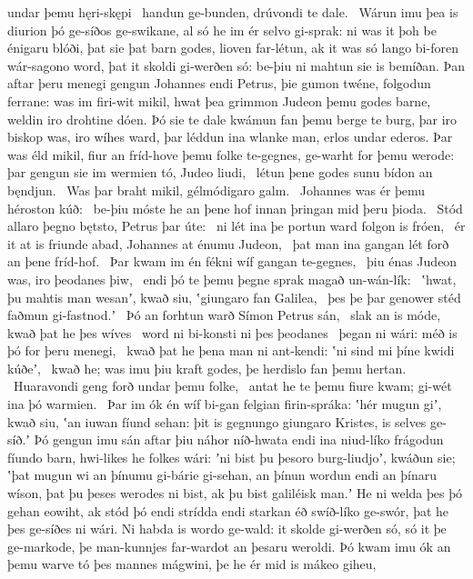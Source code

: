 undar þemu hęri-skępi \hld\ handun ge-bunden,
drúvondi te dale. \hld\ Wárun imu þea is diurion þó
ge-síðos ge-swikane, al só he im ér selvo gi-sprak:
ni was it þoh be énigaru blóði, þat sie þat barn godes,
lioven far-létun, ak it was só lango bi-foren
wár-sagono word, þat it skoldi gi-werðen só:
be-þiu ni mahtun sie is bemíðan. Þan aftar þeru menegi gengun
Johannes endi Petrus, þie gumon twéne,
folgodun ferrane: was im firi-wit mikil,
hwat þea grimmon Judeon þemu godes barne,
weldin iro drohtine dóen. Þó sie te dale kwámun
fan þemu berge te burg, þar iro biskop was,
iro wíhes ward, þar léddun ina wlanke man,
erlos undar ederos. Þar was éld mikil,
fiur an fríd-hove þemu folke te-gegnes,
ge-warht for þemu werode: þar gengun sie im wermien tó,
Judeo liudi, \hld\ létun þene godes sunu
bídon an bęndjun. \hld\ Was þar braht mikil,
gélmódigaro galm. \hld\ Johannes was ér
þemu héroston kúð: \hld\ be-þiu móste he an þene hof innan
þringan mid þeru þioda. \hld\ Stód allaro þegno bętsto,
Petrus þar úte: \hld\ ni lét ina þe portun ward
folgon is fróen, \hld\ ér it at is friunde abad,
Johannes at énumu Judeon, \hld\ þat man ina gangan lét
forð an þene fríd-hof. \hld\ Þar kwam im én fékni wíf
gangan te-gegnes, \hld\ þiu énas Judeon was,
iro þeodanes þiw, \hld\ endi þó te þemu þegne sprak
magað un-wán-lík: \hld\ ʽhwat, þu mahtis man wesanʼ, kwað siu,
ʽgiungaro fan Galilea, \hld\ þes þe þar genower stéd
faðmun gi-fastnod.ʼ \hld\ Þó an forhtun warð
Símon Petrus sán, \hld\ slak an is móde,
kwað þat he þes wíves \hld\ word ni bi-konsti
ni þes þeodanes \hld\ þegan ni wári:
méð is þó for þeru menegi, \hld\ kwað þat he þena man ni ant-kendi:
ʽni sind mi þíne kwidi kúðeʼ, \hld\ kwað he; was imu þiu kraft godes,
þe herdislo fan þemu hertan. \hld\ Huaravondi geng
forð undar þemu folke, \hld\ antat he te þemu fiure kwam;
gi-wét ina þó warmien. \hld\ Þar im ók én wíf bi-gan
felgian firin-spráka: ʽhér mugun giʼ, kwað siu, ʽan iuwan fíund sehan:
þit is gegnungo giungaro Kristes,
is selves ge-síð.ʼ Þó gengun imu sán aftar þiu
náhor níð-hwata endi ina niud-líko
frágodun fíundo barn, hwi-likes he folkes wári:
ʼni bist þu þesoro burg-liudjoʼ, kwáðun sie; ʽþat mugun wi an þínumu gi-bárie gi-sehan,
an þínun wordun endi an þínaru wíson, þat þu þeses werodes ni bist,
ak þu bist galiléisk man.ʼ He ni welda þes þó gehan eowiht,
ak stód þó endi strídda endi starkan éð
swíð-líko ge-swór, þat he þes ge-síðes ni wári.
Ni habda is wordo ge-wald: it skolde gi-werðen só,
só it þe ge-markode, þe man-kunnjes
far-wardot an þesaru weroldi. Þó kwam imu ók an þemu warve tó
þes mannes mágwini, þe he ér mid is mákeo giheu,
